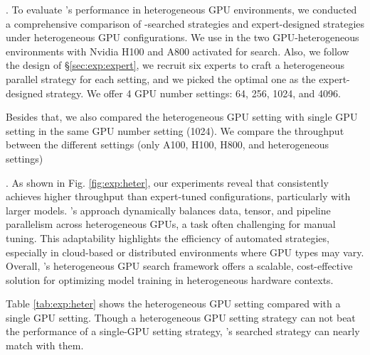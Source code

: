.
To evaluate \sysname's performance in heterogeneous GPU environments, we conducted a comprehensive comparison of \sysname-searched strategies and expert-designed strategies under heterogeneous GPU configurations. 
We use \sysname in the two GPU-heterogeneous environments with Nvidia H100 and A800 activated for search.
Also, we follow the design of \S\ref{sec:exp:expert}, we recruit six experts to craft a heterogeneous parallel strategy for each setting, and we picked the optimal one as the expert-designed strategy.
We offer 4 GPU number settings: 64, 256, 1024, and 4096.

Besides that, we also compared the heterogeneous GPU setting with single GPU setting in the same GPU number setting (1024).
We compare the throughput between the different settings (only A100, H100, H800, and heterogeneous settings)

.
As shown in Fig. \ref{fig:exp:heter}, our experiments reveal that \sysname consistently achieves higher throughput than expert-tuned configurations, particularly with larger models. \sysname’s approach dynamically balances data, tensor, and pipeline parallelism across heterogeneous GPUs, a task often challenging for manual tuning. This adaptability highlights the efficiency of automated strategies, especially in cloud-based or distributed environments where GPU types may vary. Overall, \sysname’s heterogeneous GPU search framework offers a scalable, cost-effective solution for optimizing model training in heterogeneous hardware contexts.

Table \ref{tab:exp:heter} shows the heterogeneous GPU setting compared with a single GPU setting.
Though a heterogeneous GPU setting strategy can not beat the performance of a single-GPU setting strategy, \sysname's searched strategy can nearly match with them.